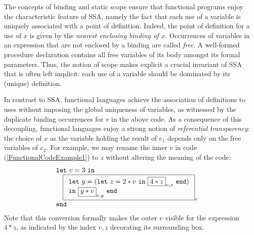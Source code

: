 The concepts of binding and static scope ensure that functional
programs enjoy the characteristic feature of SSA, namely the fact that
each use of a variable is uniquely associated with a point of
definition. Indeed, the point of definition for a use of $x$ is given
by the \emph{nearest enclosing binding of $x$}. Occurrences of
variables in an expression that are not enclosed by a binding are
called \emph{free}. A well-formed procedure declaration contains all
free variables of its body amongst its formal parameters.  Thus, the
notion of scope makes explicit a crucial invariant of SSA that is
often left implicit: each use of a variable should be dominated by its
(unique) definition.

In contrast to SSA, functional languages achieve the association of
definitions to uses without imposing the global uniqueness of
variables, as witnessed by the duplicate binding occurrences for $v$
in the above code. As a consequence of this decoupling, functional
languages enjoy a strong notion of \emph{referential transparency}:
the choice of $x$ as the variable holding the result of $e_1$ depends
only on the free variables of $e_2$. For example, we may rename the
inner $v$ in code (\ref{FunctionalCodeExample1}) to $z$ without
altering the meaning of the code:
\begin{equation}
\label{FunctionalCodeExample2}
\begin{array}{l}
\texttt{let}\ v = 3\ \texttt{in}\\
\quad 
  \fbox{$
   \begin{array}[t]{l} 
    \texttt{let}\ y = (\texttt{let}\ z=2*v \ \texttt{in}\ \fbox{$4*z$}_{v,z}\ \texttt{end})\\
    \texttt{in}\ \fbox{$y*v$}_{v,y}\ \texttt{end}\\
\end{array}$}_v\\
\texttt{end}
\end{array}
\end{equation}
Note that this conversion formally makes the outer $v$ visible for the
expression $4*z$, as indicated by the index $v,z$ decorating its
surrounding box.

